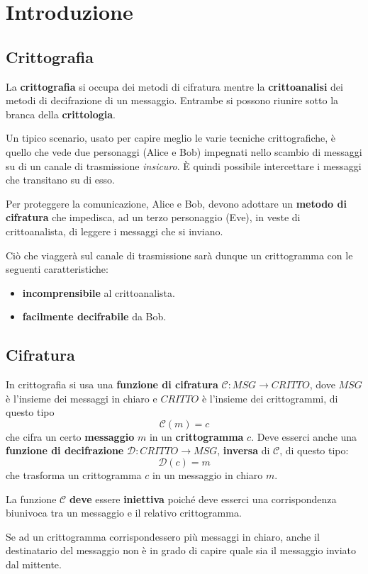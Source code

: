 \chapter{Introduzione}
\section{Crittografia}
La \textbf{crittografia} si occupa dei metodi di cifratura mentre la \textbf{crittoanalisi} dei metodi di decifrazione
di un messaggio. Entrambe si possono riunire sotto la branca della \textbf{crittologia}.

Un tipico scenario, usato per capire meglio le varie tecniche crittografiche, \`e quello che vede due personaggi (Alice
e Bob) impegnati nello scambio di messaggi su di un canale di trasmissione \emph{insicuro}. \`E quindi possibile
intercettare i messaggi che transitano su di esso.

Per proteggere la comunicazione, Alice e Bob, devono adottare un \textbf{metodo di cifratura} che impedisca, ad un terzo
personaggio (Eve), in veste di crittoanalista, di leggere i messaggi che si inviano.

Ci\`o che viagger\`a sul canale di trasmissione sar\`a dunque un crittogramma con le seguenti caratteristiche:
\begin{itemize}
	\item \textbf{incomprensibile} al crittoanalista.
	\item \textbf{facilmente decifrabile} da Bob.
\end{itemize}

\section{Cifratura}
In crittografia si usa una \textbf{funzione di cifratura} $\mathcal{C} : MSG \rightarrow CRITTO$, dove $MSG$ \`e l'insieme
dei messaggi in chiaro e $CRITTO$ \`e l'insieme dei crittogrammi, di questo tipo
\[ \mathcal{C}(m) = c \]
che cifra un certo \textbf{messaggio} $m$ in un \textbf{crittogramma} $c$. Deve esserci anche una
\textbf{funzione di decifrazione} $\mathcal{D} : CRITTO \rightarrow MSG$, \textbf{inversa} di $\mathcal{C}$, di questo
tipo:
\[ \mathcal{D}(c) = m \]
che trasforma un crittogramma $c$ in un messaggio in chiaro $m$.

La funzione $\mathcal{C}$ \textbf{deve} essere \textbf{iniettiva} poich\'e deve esserci una corrispondenza biunivoca
tra un messaggio e il relativo crittogramma.

Se ad un crittogramma corrispondessero pi\`u messaggi in chiaro, anche il destinatario del messaggio non \`e in grado
di capire quale sia il messaggio inviato dal mittente.

